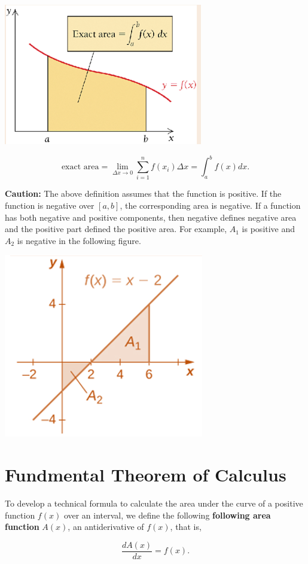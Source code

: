 \documentclass[
]{book}
\begin{document}
\begin{center}\includegraphics[width=0.45\linewidth]{img12/DefinitionDefiniteIntegral} \end{center}

\[
\text{exact area} = \lim_{\Delta x \to 0} \sum_{i=1}^n f(x_i)\Delta x = \int_a^bf(x) dx.
\]

\textbf{\color{red}Caution:} The above definition assumes that the function is positive. If the function is negative over \([a,b]\), the corresponding area is negative. If a function has both negative and positive components, then negative defines negative area and the positive part defined the positive area. For example, \(A_1\) is positive and \(A_2\) is negative in the following figure.

\begin{center}\includegraphics[width=0.35\linewidth]{img12/negativePositiveArea} \end{center}

\hfill\break

\hypertarget{fundmental-theorem-of-calculus}{%
\section{Fundmental Theorem of Calculus}\label{fundmental-theorem-of-calculus}}

To develop a technical formula to calculate the area under the curve of a positive function \(f(x)\) over an interval, we define the following \textbf{following area function} \(A(x)\), an antiderivative of \(f(x)\), that is,

\[
\frac{d A(x)}{dx} = f(x).
\]
\end{document}
